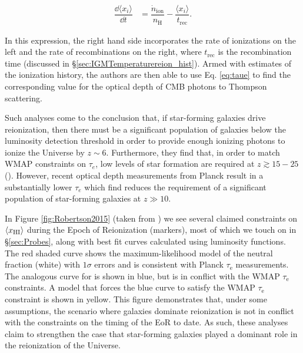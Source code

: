 \begin{align}
\dfrac{\dd \langle x_{i}\rangle}{\dd t} &= \dfrac{\dot{n}_{\text{ion}}}{n_{\text{H}}} - \dfrac{\langle x_i \rangle}{t_{\text{rec}}}.
\end{align}

In this expression, the right hand side incorporates the rate of ionizations on the left and the rate of recombinations on the right, where $t_{\text{rec}}$ is the recombination time (discussed in \S \ref{sec:IGMTemperaturereion_hist}). Armed with estimates of the ionization history, the authors are then able to use Eq. \ref{eq:taue} to find the corresponding value for the optical depth of CMB photons to Thompson scattering. 
 

Such analyses come to the conclusion that, if star-forming galaxies drive reionization, then there must be a significant population of galaxies below the luminosity detection threshold in order to provide enough ionizing photons to ionize the Universe by $z \sim 6$. Furthermore, they find that, in order to match WMAP constraints on $\tau_{e}$, low levels of star formation are required at $z \gtrsim 15-25$ (\citealt{Robertson2013}). However, recent optical depth measurements from Planck result in a substantially lower $\tau_{e}$ which \cite{robertson2015cosmic} find reduces the requirement of a significant population of star-forming galaxies at $z \gg 10$. 


In Figure \ref{fig:Robertson2015} (taken from \citealt{robertson2015cosmic}) we see several claimed constraints on $\langle x_{\text{HI}}\rangle$ during the Epoch of Reionization (markers), most of which we touch on in \S \ref{sec:Probes}, along with best fit curves calculated using luminosity functions. The red shaded curve shows the maximum-likelihood model of the neutral fraction (white) with $1\sigma$ errors and is consistent with Planck $\tau_{\text{e}}$ measurements. The analogous curve for \cite{Robertson2013} is shown in blue, but is in conflict with the WMAP $\tau_{\text{e}}$ constraints. A model that forces the blue curve to satisfy the WMAP $\tau_{\text{e}}$ constraint is shown in yellow. This figure demonstrates that, under some assumptions, the scenario where galaxies dominate reionization is not in conflict with the constraints on the timing of the EoR to date. As such, these analyses claim to strengthen the case that star-forming galaxies played a dominant role in the reionization of the Universe. 

